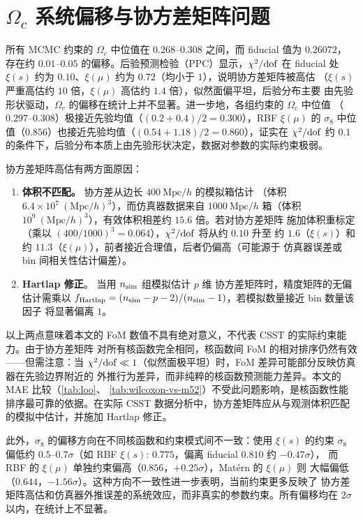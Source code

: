 \section{\texorpdfstring{$\Omega_c$}{Ωc} 系统偏移与协方差矩阵问题}\label{sec:omega-c-bias}

所有 MCMC 约束的 $\Omega_c$ 中位值在 $0.268$--$0.308$ 之间，而 fiducial 值为 $0.26072$，
存在约 $0.01$--$0.05$ 的偏移。后验预测检验（PPC）显示，$\chi^{2}/{\rm dof}$ 在 fiducial
处 $\xi(s)$ 约为 $0.10$、$\xi(\mu)$ 约为 $0.72$（均小于 $1$），说明协方差矩阵被高估
（$\xi(s)$ 严重高估约 $10$ 倍，$\xi(\mu)$ 高估约 $1.4$ 倍），似然面偏平坦，后验分布主要
由先验形状驱动，$\Omega_c$ 的偏移在统计上并不显著。进一步地，各组约束的 $\Omega_c$ 中位值
（$0.297$--$0.308$）极接近先验均值（$(0.2+0.4)/2=0.300$），RBF $\xi(\mu)$ 的 $\sigma_8$
中位值（$0.856$）也接近先验均值（$(0.54+1.18)/2=0.860$），证实在 $\chi^{2}/{\rm dof}$
约 $0.1$ 的条件下，后验分布本质上由先验形状决定，数据对参数的实际约束极弱。

协方差矩阵高估有两方面原因：
\begin{enumerate}
  \item \textbf{体积不匹配。} 协方差从边长 $400~\mathrm{Mpc}/h$ 的模拟箱估计
    （体积 $6.4\times 10^{7}~(\mathrm{Mpc}/h)^{3}$），而仿真器数据来自 $1000~\mathrm{Mpc}/h$
    箱（体积 $10^{9}~(\mathrm{Mpc}/h)^{3}$），有效体积相差约 $15.6$ 倍。若对协方差矩阵
    施加体积重标定（乘以 $(400/1000)^{3}=0.064$），$\chi^{2}/{\rm dof}$ 将从约 $0.10$ 升至
    约 $1.6$（$\xi(s)$）和约 $11.3$（$\xi(\mu)$），前者接近合理值，后者仍偏高（可能源于
    仿真器误差或 bin 间相关性估计偏差）。
  \item \textbf{Hartlap 修正}\cite{Hartlap2007}。 当用 $n_{\rm sim}$ 组模拟估计 $p$ 维
    协方差矩阵时，精度矩阵的无偏估计需乘以
    $f_{\rm Hartlap}=(n_{\rm sim}-p-2)/(n_{\rm sim}-1)$，若模拟数量接近 bin 数量该因子
    将显著偏离 $1$。
\end{enumerate}
以上两点意味着本文的 FoM 数值不具有绝对意义，不代表 CSST 的实际约束能力。由于协方差矩阵
对所有核函数完全相同，核函数间 FoM 的相对排序仍然有效——但需注意：当
$\chi^{2}/{\rm dof}\ll 1$（似然面极平坦）时，FoM 差异可能部分反映仿真器在先验边界附近的
外推行为差异，而非纯粹的核函数预测能力差异。本文的 MAE 比较（\autoref{tab:loo}、
\autoref{tab:wilcoxon-vs-m52}）不受此问题影响，是核函数性能排序最可靠的依据。在实际
CSST 数据分析中，协方差矩阵应从与观测体积匹配的模拟中估计，并施加 Hartlap 修正。

此外，$\sigma_8$ 的偏移方向在不同核函数和约束模式间不一致：使用 $\xi(s)$ 的约束 $\sigma_8$
偏低约 $0.5$--$0.7\sigma$（如 RBF $\xi(s)$: $0.775$，偏离 fiducial $0.810$ 约 $-0.47\sigma$），
而 RBF 的 $\xi(\mu)$ 单独约束偏高（$0.856$，$+0.25\sigma$），Mat\'ern 的 $\xi(\mu)$ 则
大幅偏低（$0.644$，$-1.56\sigma$）。这种方向不一致性进一步表明，当前约束更多反映了
协方差矩阵高估和仿真器外推误差的系统效应，而非真实的参数约束。所有偏移均在 $2\sigma$
以内，在统计上不显著。

